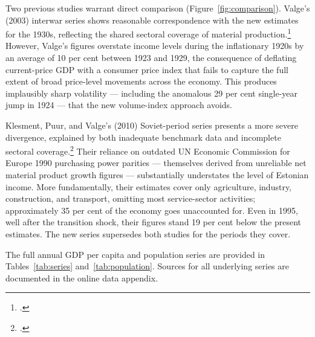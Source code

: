 \documentclass[12pt,a4paper]{article}
\begin{document}
Two previous studies warrant direct comparison (Figure~\ref{fig:comparison}). Valge's (2003) interwar series shows reasonable correspondence with the new estimates for the 1930s, reflecting the shared sectoral coverage of material production.\footnote{\autocite{valge2003all}.} However, Valge's figures overstate income levels during the inflationary 1920s by an average of 10 per cent between 1923 and 1929, the consequence of deflating current-price GDP with a consumer price index that fails to capture the full extent of broad price-level movements across the economy. This produces implausibly sharp volatility — including the anomalous 29 per cent single-year jump in 1924 — that the new volume-index approach avoids.

Klesment, Puur, and Valge's (2010) Soviet-period series presents a more severe divergence, explained by both inadequate benchmark data and incomplete sectoral coverage.\footnote{\autocite{klesment2010}.} Their reliance on outdated UN Economic Commission for Europe 1990 purchasing power parities — themselves derived from unreliable net material product growth figures — substantially understates the level of Estonian income. More fundamentally, their estimates cover only agriculture, industry, construction, and transport, omitting most service-sector activities; approximately 35 per cent of the economy goes unaccounted for. Even in 1995, well after the transition shock, their figures stand 19 per cent below the present estimates. The new series supersedes both studies for the periods they cover.

The full annual GDP per capita and population series are provided in Tables~\ref{tab:series} and~\ref{tab:population}. Sources for all underlying series are documented in the online data appendix.












\end{document}
